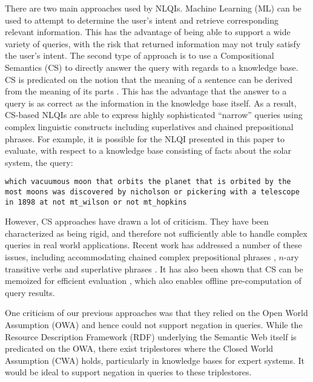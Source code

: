 \documentclass[../main.tex]{subfiles}
\begin{document}
\begin{refsection}
There are two main approaches used by NLQIs.  Machine Learning (ML) can be used to attempt to determine the user's intent and retrieve corresponding relevant information.  This has the advantage of being able to support a wide variety of queries, with the risk that returned information may not truly satisfy the user's intent.  The second type of approach is to use a Compositional Semantics (CS) to directly answer the query with regards to a knowledge base.  CS is predicated on the notion that the meaning of a sentence can be derived from the meaning of its parts \cite{Dowty:wall}.  This has the advantage that the answer to a query is as correct as the information in the knowledge base itself. As a result, CS-based NLQIs are able to express highly sophisticated ``narrow'' queries using complex linguistic constructs including superlatives and chained prepositional phrases.  For example, it is possible for the NLQI presented in this paper to evaluate, with respect to a knowledge base consisting of facts about the solar system, the query:
\begin{center}
	\texttt{which vacuumous moon that orbits the planet that is orbited by the most moons was discovered by nicholson or pickering with a telescope in 1898 at not mt\_wilson or not mt\_hopkins}
\end{center}
However, CS approaches have drawn a lot of criticism.  They have been characterized as being rigid, and therefore not sufficiently able to handle complex queries in real world applications.  Recent work has addressed a number of these issues, including accommodating chained complex prepositional phrases \cite{peelar2016accommodating}, $n$-ary transitive verbs \cite{peelar2020compositional} and superlative phrases \cite{frostpeelar2019}.  It has also been shown that CS can be memoized for efficient evaluation \cite{peelar2020webistjournal}, which also enables offline pre-computation of query results.  %

One criticism of our previous approaches was that they relied on the Open World Assumption (OWA) and hence could not support negation in queries.  While the Resource Description Framework (RDF) \cite{w3csemanticweb} underlying the Semantic Web itself is predicated on the OWA, there exist triplestores where the Closed World Assumption (CWA) holds, particularly in knowledge bases for expert systems.  It would be ideal to support negation in queries to these triplestores.


\end{refsection}
\end{document}
